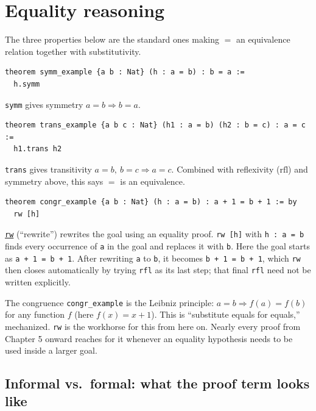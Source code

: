 \section{Equality reasoning}\label{sec:04-propositions-and-proofs:07-equality:1}

The three properties below are the standard ones making \(=\) an equivalence relation together with substitutivity.

\begin{lstlisting}
theorem symm_example {a b : Nat} (h : a = b) : b = a :=
  h.symm
\end{lstlisting}

\texttt{symm} gives symmetry \(a = b \Rightarrow b = a\).

\begin{lstlisting}
theorem trans_example {a b c : Nat} (h1 : a = b) (h2 : b = c) : a = c :=
  h1.trans h2
\end{lstlisting}

\texttt{trans} gives transitivity \(a = b,\ b = c \Rightarrow a = c\). Combined with reflexivity (\(\mathrm{rfl}\)) and symmetry above, this says \(=\) is an equivalence.

\begin{lstlisting}
theorem congr_example {a b : Nat} (h : a = b) : a + 1 = b + 1 := by
  rw [h]
\end{lstlisting}

\href{https://lean-lang.org/doc/reference/latest/Tactic-Proofs/Tactic-Reference/}{\texttt{rw}} (``rewrite'') rewrites the goal using an equality proof. \texttt{rw [h]} with \texttt{h : a = b} finds every occurrence of \texttt{a} in the goal and replaces it with \texttt{b}. Here the goal starts as \texttt{a + 1 = b + 1}. After rewriting \texttt{a} to \texttt{b}, it becomes \texttt{b + 1 = b + 1}, which \texttt{rw} then closes automatically by trying \texttt{rfl} as its last step; that final \texttt{rfl} need not be written explicitly.

The congruence \texttt{congr\_\allowbreak{}example} is the Leibniz principle: \(a = b \Rightarrow
f(a) = f(b)\) for any function \(f\) (here \(f(x) = x + 1\)). This is ``substitute equals for equals,'' mechanized. \texttt{rw} is the workhorse for this from here on. Nearly every proof from Chapter 5 onward reaches for it whenever an equality hypothesis needs to be used inside a larger goal.

\subsection{Informal vs.~formal: what the proof term looks like}\label{sec:04-propositions-and-proofs:07-equality:2}

